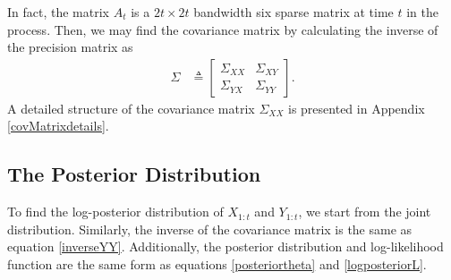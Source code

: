 In fact, the matrix $A_t$ is a $2t \times 2t$ bandwidth six sparse matrix at time $t$ in the process. Then, we may find the covariance matrix by calculating the inverse of the precision matrix as 
\begin{align}
\Sigma & %
\triangleq \begin{bmatrix}
\Sigma_{XX} & \Sigma_{XY} \\
\Sigma_{YX}  &\Sigma_{YY} 
\end{bmatrix}.
\end{align}
A detailed structure of the covariance matrix $\Sigma_{XX} $ is presented in Appendix \ref{covMatrixdetails}. 

\subsection{The Posterior Distribution}

To find the log-posterior distribution of $X_{1:t}$ and $Y_{1:t}$, we start from the joint distribution. Similarly, the inverse of the covariance matrix is 
the same as equation \eqref{inverseYY}. Additionally, the posterior distribution and log-likelihood function are the same form as equations \eqref{posteriortheta} and \eqref{logposteriorL}. 





